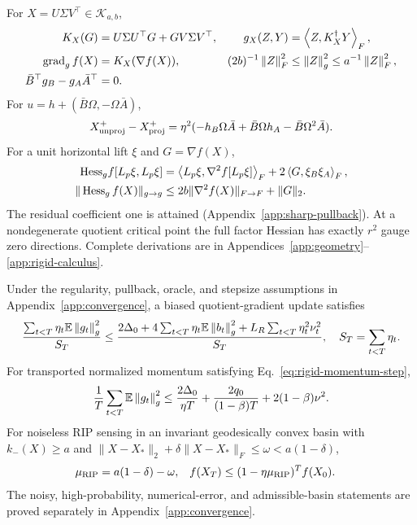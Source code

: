 \begin{theorem}
For $X=U\Sigma V^\top\in\mathcal K_{a,b}$,
\begin{align}
K_X(G)&=U\Sigma U^\top G+GV\Sigma V^\top,&
g_X(Z,Y)&=\left\langle Z,K_X^\dagger Y\right\rangle_F,\\
\operatorname{grad}_g f(X)&=K_X(\nabla f(X)),&
(2b)^{-1}\left\lVert Z\right\rVert_F^2&\leq\left\lVert Z\right\rVert_g^2\leq a^{-1}\left\lVert Z\right\rVert_F^2,\\
\bar B^\top g_B-g_A\bar A^\top&=0 .
\end{align}
For $u=h+(\bar B\Omega,-\Omega\bar A)$,
\begin{equation}
X_{\rm unproj}^+-X_{\rm proj}^+
=\eta^2(-h_B\Omega\bar A+\bar B\Omega h_A-\bar B\Omega^2\bar A).
\label{eq:main-cross}
\end{equation}
For a unit horizontal lift $\xi$ and $G=\nabla f(X)$,
\begin{align}
{\rm Hess}_g f[L_p\xi,L_p\xi]
&=\left\langle L_p\xi,\nabla^2 f[L_p\xi]\right\rangle_F+2\left\langle G,\xi_B\xi_A\right\rangle_F,\\
\|\operatorname{Hess}_g f(X)\|_{g\to g}
&\leq 2b\|\nabla^2 f(X)\|_{F\to F}+\|G\|_2 .
\end{align}
The residual coefficient one is attained
(Appendix~\ref{app:sharp-pullback}).
At a nondegenerate quotient critical point the full factor Hessian has
exactly $r^2$ gauge zero directions. Complete derivations are in
Appendices~\ref{app:geometry}--\ref{app:rigid-calculus}.
\end{theorem}

\begin{theorem}
Under the regularity, pullback, oracle, and stepsize assumptions in
Appendix~\ref{app:convergence}, a biased quotient-gradient update satisfies
\begin{equation}
\frac{\sum_{t<T}\eta_t\mathbb E\left\lVert g_t\right\rVert_g^2}{S_T}
\leq\frac{2\Delta_0+
4\sum_{t<T}\eta_t\mathbb E\left\lVert b_t\right\rVert_g^2+
L_R\sum_{t<T}\eta_t^2\nu_t^2}{S_T},
\quad S_T=\sum_{t<T}\eta_t .
\label{eq:main-convergence}
\end{equation}
For transported normalized momentum satisfying
Eq.~\eqref{eq:rigid-momentum-step},
\begin{equation}
\frac1T\sum_{t<T}\mathbb E\left\lVert g_t\right\rVert_g^2
\leq\frac{2\Delta_0}{\eta T}
+\frac{2q_0}{(1-\beta)T}+2(1-\beta)\nu^2 .
\end{equation}
For noiseless RIP sensing in an invariant geodesically convex basin
with $k_-(X)\geq a$ and
$\|X-X_*\|_2+\delta\|X-X_*\|_F\leq\omega<a(1-\delta)$,
\begin{align}
\mu_{\rm RIP}&=a(1-\delta)-\omega,&
f(X_T)&\leq(1-\eta\mu_{\rm RIP})^Tf(X_0).
\end{align}
The noisy, high-probability, numerical-error, and admissible-basin
statements are proved separately in Appendix~\ref{app:convergence}.
\end{theorem}

